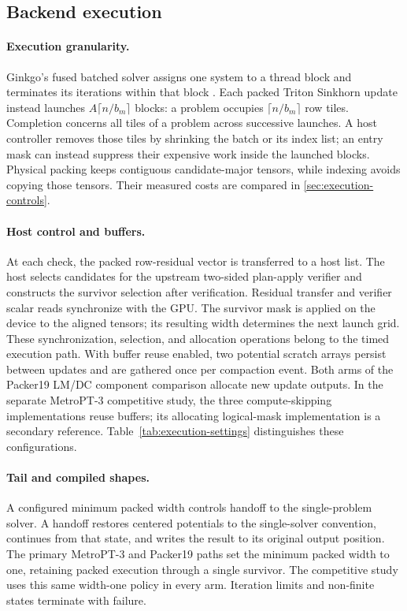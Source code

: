 \subsection{Backend execution}

\paragraph{Execution granularity.}
Ginkgo's fused batched solver assigns one system to a thread block and terminates its iterations within that block \citep{kashi2023batched}. Each packed Triton Sinkhorn update instead launches $A\lceil n/b_m\rceil$ blocks: a problem occupies $\lceil n/b_m\rceil$ row tiles. Completion concerns all tiles of a problem across successive launches. A host controller removes those tiles by shrinking the batch or its index list; an entry mask can instead suppress their expensive work inside the launched blocks. Physical packing keeps contiguous candidate-major tensors, while indexing avoids copying those tensors. Their measured costs are compared in \cref{sec:execution-controls}.

\paragraph{Host control and buffers.}
At each check, the packed row-residual vector is transferred to a host list. The host selects candidates for the upstream two-sided plan-apply verifier and constructs the survivor selection after verification. Residual transfer and verifier scalar reads synchronize with the GPU. The survivor mask is applied on the device to the aligned tensors; its resulting width determines the next launch grid. These synchronization, selection, and allocation operations belong to the timed execution path. With buffer reuse enabled, two potential scratch arrays persist between updates and are gathered once per compaction event. Both arms of the Packer19 LM/DC component comparison allocate new update outputs. In the separate MetroPT-3 competitive study, the three compute-skipping implementations reuse buffers; its allocating logical-mask implementation is a secondary reference. Table~\ref{tab:execution-settings} distinguishes these configurations.

\paragraph{Tail and compiled shapes.}
A configured minimum packed width controls handoff to the single-problem solver. A handoff restores centered potentials to the single-solver convention, continues from that state, and writes the result to its original output position. The primary MetroPT-3 and Packer19 paths set the minimum packed width to one, retaining packed execution through a single survivor. The competitive study uses this same width-one policy in every arm. Iteration limits and non-finite states terminate with failure.

